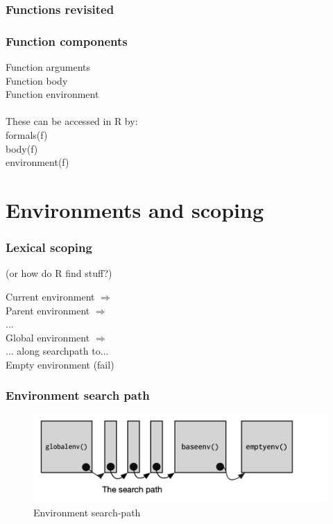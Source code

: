 \documentclass{beamer}
\begin{document}

\begin{frame}
	\frametitle{Functions revisited}
	\lstFun
\end{frame}

\begin{frame}
	\frametitle{Function components}
	Function arguments \\
	Function body \\
	Function environment \\~\\

	These can be accessed in R by: \\
	formals(f) \\
	body(f) \\
	environment(f)	
\end{frame}


\section{Environments and scoping}

\begin{frame}
	\frametitle{Lexical scoping}
	\centerline{(or how do R find stuff?)}
	\begin{center}
		Current environment $\Rightarrow$ \\
		Parent environment $\Rightarrow$ \\
		... \\
		Global environment $\Rightarrow$ \\
		... along searchpath to... \\
		Empty environment (fail)
	\end{center}
\end{frame}

\begin{frame}
	\frametitle{Environment search path}
	\begin{figure}[!ht]
		\includegraphics[scale=0.90]{figures/search-path}
		\caption{Environment search-path}
		\label{fig:enviii}
	\end{figure}
\end{frame}
\end{document}
